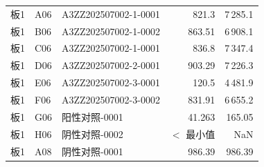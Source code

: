 \documentclass[UTF8,10pt,a4paper,fontset=fandol]{ctexart}
\newcommand{\fieldvalue}[1]{#1}
\begin{document}
\bigskip

\begin{tabularx}{\textwidth}{@{}l l X r r@{}}
板1 &
\fieldvalue{A06} &
\fieldvalue{A3ZZ202507002-1-0001} &
\fieldvalue{821.3} &
\fieldvalue{7\,285.1}
\\
板1 &
\fieldvalue{B06} &
\fieldvalue{A3ZZ202507002-1-0002} &
\fieldvalue{863.51} &
\fieldvalue{6\,908.1}
\\
板1 &
\fieldvalue{C06} &
\fieldvalue{A3ZZ202507002-1-0001} &
\fieldvalue{836.8} &
\fieldvalue{7\,347.4}
\\
板1 &
\fieldvalue{D06} &
\fieldvalue{A3ZZ202507002-2-0001} &
\fieldvalue{903.29} &
\fieldvalue{7\,226.3}
\\
板1 &
\fieldvalue{E06} &
\fieldvalue{A3ZZ202507002-3-0001} &
\fieldvalue{120.5} &
\fieldvalue{4\,481.9}
\\
板1 &
\fieldvalue{F06} &
\fieldvalue{A3ZZ202507002-3-0002} &
\fieldvalue{831.91} &
\fieldvalue{6\,655.2}
\\
板1 &
\fieldvalue{G06} &
\fieldvalue{阳性对照-0001} &
\fieldvalue{41.263} &
\fieldvalue{165.05}
\\
板1 &
\fieldvalue{H06} &
\fieldvalue{阴性对照-0002} &
\fieldvalue{$<$ 最小值} &
\fieldvalue{NaN}
\\
板1 &
\fieldvalue{A08} &
\fieldvalue{阴性对照-0001} &
\fieldvalue{986.39} &
\fieldvalue{986.39}
\end{tabularx}
\end{document}
